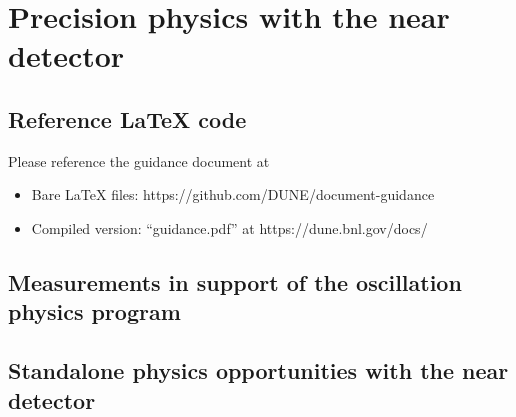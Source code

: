 \chapter{Precision physics with the near detector}
\label{ch:prec-nd}

\section{Reference LaTeX code}

Please reference the guidance document at 

\begin{itemize}
\item Bare LaTeX files: https://github.com/DUNE/document-guidance
\item Compiled version: ``guidance.pdf'' at https://dune.bnl.gov/docs/
\end{itemize}


\section{Measurements in support of the oscillation physics program}
\label{sec:prec-nd-support}


\section{Standalone physics opportunities with the near detector}
\label{sec:prec-nd-standalone}
